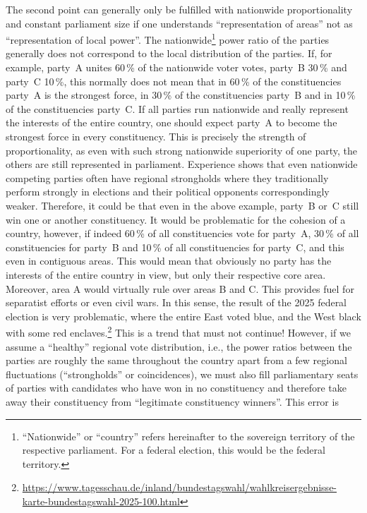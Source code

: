 The second point can generally only be fulfilled with nationwide proportionality and constant parliament size if one understands
\enquote{representation of areas} not as
\enquote{representation of local power}.
The nationwide\footnote{\enquote{Nationwide} or \enquote{country} refers hereinafter to
the sovereign territory of the respective parliament. For a federal election, this would be the
federal territory.} power ratio of the parties generally does not correspond to the local distribution
of the parties. If, for example, party~A unites 60\,\% of the nationwide voter votes,
party~B 30\,\% and party~C 10\,\%, this normally does not mean that in 60\,\% of the constituencies
party~A is the strongest force, in 30\,\% of the constituencies party~B and in 10\,\% of the constituencies
party~C. If all parties run nationwide and really represent the interests of the entire country,
one should expect party~A to become the strongest force in every constituency. This
is precisely the strength of proportionality, as even with such strong nationwide superiority of one
party, the others are still represented in parliament. Experience shows that even nationwide
competing parties often have regional strongholds where they traditionally
perform strongly in elections and their political opponents correspondingly weaker. Therefore, it could be that
even in the above example, party~B or~C still win one or another constituency.
It would be problematic for the cohesion of a country, however, if indeed 60\,\% of all
constituencies vote for party~A, 30\,\% of all constituencies for party~B and 10\,\% of all constituencies for party~C,
and this even in contiguous areas. This would mean that obviously no
party has the interests of the entire country in view, but only their respective core area.
Moreover, area A would virtually rule over areas B and C. This provides fuel for
separatist efforts or even civil wars.
In this sense, the result of the 2025 federal election is very problematic, where the entire East voted blue,
and the West black with some red enclaves.\footnote{\url{https://www.tagesschau.de/inland/bundestagswahl/wahlkreisergebnisse-karte-bundestagswahl-2025-100.html}} This is a
trend that must not continue!
However, if we assume a \enquote{healthy} regional vote distribution, i.e., the
power ratios between the parties are roughly the same throughout the country apart from a few
regional fluctuations (\enquote{strongholds} or coincidences), we must also fill parliamentary seats of
parties with candidates who have won in no constituency and therefore
take away their constituency from \enquote{legitimate constituency winners}. This error is
